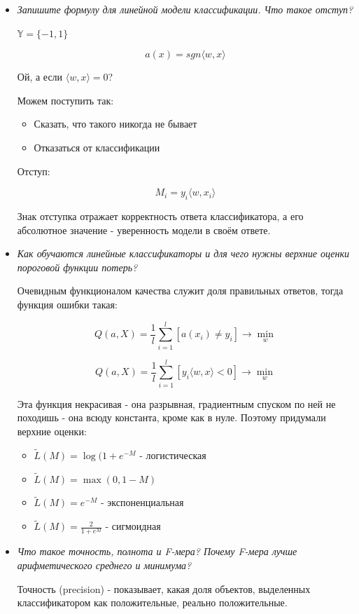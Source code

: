 \documentclass[a4paper]{article}
\begin{document}
\begin{itemize}

\item \textit{Запишите формулу для линейной модели классификации. Что такое отступ?}

$\mathbb{Y} = \{ -1, 1 \}$

\[ a(x) = sgn \langle w, x \rangle \]

Ой, а если $\langle w, x \rangle = 0$?

Можем поступить так:
\begin{itemize}
\item Сказать, что такого никогда не бывает
\item Отказаться от классификации
\end{itemize}

Отступ:

\[ M_i = y_i \langle w, x_i \rangle \]

Знак отступка отражает корректность ответа классификатора, а его абсолютное значение - уверенность модели в своём ответе.

\item \textit{Как обучаются линейные классификаторы и для чего нужны верхние оценки пороговой функции потерь?}

Очевидным функционалом качества служит доля правильных ответов, тогда функция ошибки такая:

\[  Q(a, X) = \frac{1}{l} \sum_{i=1}^l [a(x_i) \neq y_i] \rightarrow \min_w \]

\[ Q(a, X) = \frac{1}{l} \sum_{i=1}^l [y_i \langle w, x \rangle < 0] \rightarrow \min_w \]

Эта функция некрасивая - она разрывная, градиентным спуском по ней не походишь - она всюду константа, кроме как в нуле. Поэтому придумали верхние оценки:

\begin{itemize}
\item $ \widetilde{L}(M) = \log (1+e^{-M} $ - логистическая
\item $ \widetilde{L}(M) = \max(0, 1-M)$
\item $ \widetilde{L}(M) = e^{-M}$ - экспоненциальная
\item $ \widetilde{L}(M) = \frac{2}{1+e^M}$ - сигмоидная
\end{itemize}

\item \textit{Что такое точность, полнота и F-мера? Почему F-мера лучше арифметического среднего и минимума?}

Точность (precision) - показывает, какая доля объектов, выделенных классификатором как положительные, реально положительные.


\end{itemize}
\end{document}
